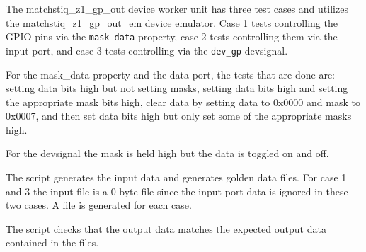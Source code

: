 \documentclass{article}
\begin{document}
\begin{flushleft}

The matchstiq\_z1\_gp\_out device worker unit has three test cases and utilizes the matchstiq\_z1\_gp\_out\_em device emulator. Case 1 tests controlling the GPIO pins via the \texttt{mask\_data} property, case 2 tests controlling them via the input port, and case 3 tests controlling via the \texttt{dev\_gp} devsignal. \newline

For the mask\_data property and the data port, the tests that are done are: setting data bits high but not setting masks, setting data bits high and setting the appropriate mask bits high, clear data by setting data to 0x0000 and mask to 0x0007,
and then set data bits high but only set some of the appropriate masks high.\newline

For the devsignal the mask is held high but the data is toggled on and off. \newline
  
The  script generates the input data and generates golden data files. For case 1 and 3 the input file is a 0 byte file since the input port data is ignored in these two cases. A  file is generated for each case. \newline

The  script checks that the output data matches the expected output data contained in the  files.

\end{flushleft}
\end{document}
